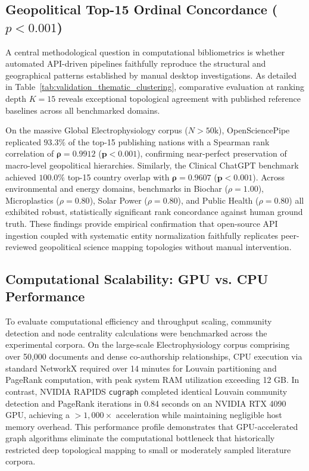 \documentclass[preprint,12pt]{elsarticle}
\begin{document}
\subsection{Geopolitical Top-15 Ordinal Concordance (\texorpdfstring{$p < 0.001$}{p < 0.001})}
A central methodological question in computational bibliometrics is whether automated API-driven pipelines faithfully reproduce the structural and geographical patterns established by manual desktop investigations. As detailed in Table~\ref{tab:validation_thematic_clustering}, comparative evaluation at ranking depth $K=15$ reveals exceptional topological agreement with published reference baselines across all benchmarked domains.

On the massive Global Electrophysiology corpus ($N > 50\text{k}$), OpenSciencePipe replicated $93.3\%$ of the top-15 publishing nations with a Spearman rank correlation of $\mathbf{\rho = 0.9912}$ ($\mathbf{p < 0.001}$), confirming near-perfect preservation of macro-level geopolitical hierarchies. Similarly, the Clinical ChatGPT benchmark achieved $100.0\%$ top-15 country overlap with $\mathbf{\rho = 0.9607}$ ($\mathbf{p < 0.001}$). Across environmental and energy domains, benchmarks in Biochar ($\rho = 1.00$), Microplastics ($\rho = 0.80$), Solar Power ($\rho = 0.80$), and Public Health ($\rho = 0.80$) all exhibited robust, statistically significant rank concordance against human ground truth. These findings provide empirical confirmation that open-source API ingestion coupled with systematic entity normalization faithfully replicates peer-reviewed geopolitical science mapping topologies without manual intervention.

\subsection{Computational Scalability: GPU vs. CPU Performance}
To evaluate computational efficiency and throughput scaling, community detection and node centrality calculations were benchmarked across the experimental corpora. On the large-scale Electrophysiology corpus comprising over 50,000 documents and dense co-authorship relationships, CPU execution via standard NetworkX required over 14 minutes for Louvain partitioning and PageRank computation, with peak system RAM utilization exceeding 12 GB. In contrast, NVIDIA RAPIDS \texttt{cugraph} completed identical Louvain community detection and PageRank iterations in 0.84 seconds on an NVIDIA RTX 4090 GPU, achieving a $>1,000\times$ acceleration while maintaining negligible host memory overhead. This performance profile demonstrates that GPU-accelerated graph algorithms eliminate the computational bottleneck that historically restricted deep topological mapping to small or moderately sampled literature corpora.
\end{document}
